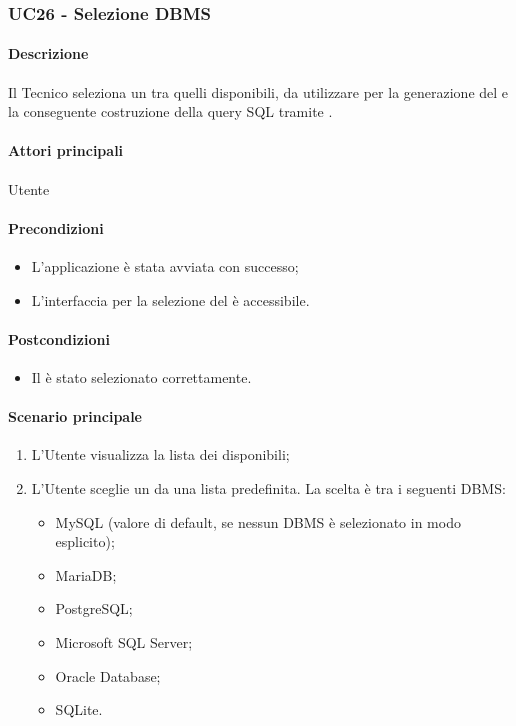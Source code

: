 \subsubsection{UC26 - Selezione DBMS}\label{UC26}

\paragraph*{Descrizione}
Il Tecnico seleziona un  tra quelli disponibili, da utilizzare per la generazione del  e la conseguente costruzione della query SQL tramite .

\paragraph*{Attori principali}
Utente

\paragraph*{Precondizioni}
\begin{itemize}
  \item L'applicazione è stata avviata con successo;
  \item L'interfaccia per la selezione del  è accessibile.
\end{itemize}

\paragraph*{Postcondizioni}
\begin{itemize}
  \item Il  è stato selezionato correttamente.
\end{itemize}

\paragraph*{Scenario principale}
\begin{enumerate}
  \item L'Utente visualizza la lista dei  disponibili;
  \item L'Utente sceglie un  da una lista predefinita. La scelta è tra i seguenti DBMS:
    \begin{itemize}
      \item MySQL (valore di default, se nessun DBMS è selezionato in modo esplicito);
      \item MariaDB;
      \item PostgreSQL;
      \item Microsoft SQL Server;
      \item Oracle Database;
      \item SQLite.
    \end{itemize} 
\end{enumerate}

